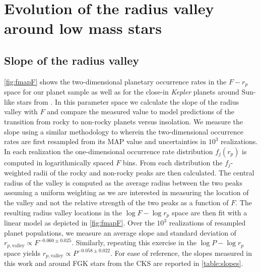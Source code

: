 \documentclass[twocolumn]{emulateapj}
\newcommand{\kepler}[1]{\emph{Kepler}#1}
\begin{document}
\section{Evolution of the radius valley around low mass stars} \label{sect:models}
\subsection{Slope of the radius valley}
\autoref{fig:fmapF} shows the two-dimensional planetary occurrence rates in the $F-r_p$ space for
our planet sample as well as for the close-in \kepler{} planets around Sun-like stars
from \cite{martinez19}.
In this parameter space we calculate the slope of the radius valley with $F$ and compare the measured
value to model predictions of the transition from rocky to non-rocky planets
versus insolation. We measure the slope using a similar methodology to \cite{martinez19} wherein
the two-dimensional occurrence rates are first resampled from its MAP value and uncertainties in
$10^3$ realizations. In each realization the
one-dimensional occurrence rate distribution $f_j(r_p)$ is computed in logarithmically spaced $F$
bins. From each distribution the $f_j$-weighted radii of the rocky and non-rocky peaks are then calculated.
The central radius of the valley is computed as the average radius between the two peaks
assuming a uniform weighting as we are interested in measuring the location of the valley and not the relative
strength of the two peaks as a function of $F$. The resulting radius valley locations in the $\log{F}-\log{r_p}$
space are then fit with a linear model as depicted in \autoref{fig:fmapF}. 
Over the $10^3$ realizations of resampled planet
populations, we measure an average slope and standard deviation of
$r_{p,\text{valley}} \propto F^{-0.060\pm 0.025}$. Similarly, repeating this exercise in the $\log{P}-\log{r_p}$
space yields $r_{p,\text{valley}} \propto P^{-0.058\pm 0.022}$. For ease of reference, the slopes measured
in this work and around FGK stars from the CKS \citep{martinez19} are reported in \autoref{table:slopes}.


\end{document}
